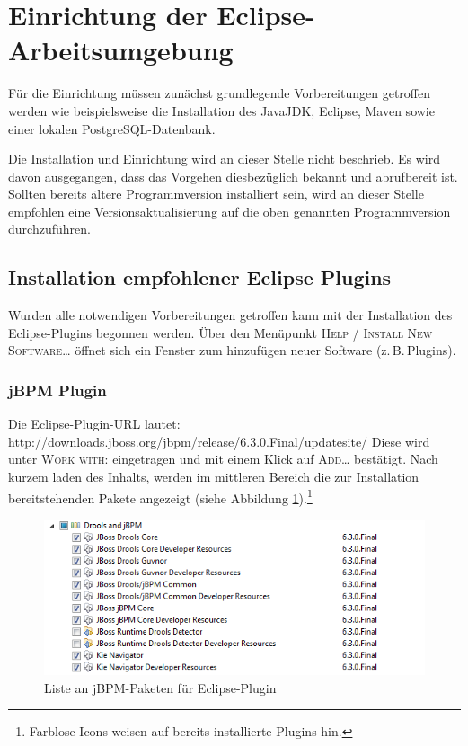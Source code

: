 \section{Einrichtung der Eclipse-Arbeitsumgebung}
Für die Einrichtung müssen zunächst grundlegende Vorbereitungen getroffen werden wie beispielsweise die Installation des JavaJDK, Eclipse, Maven sowie einer lokalen PostgreSQL-Datenbank.

Die Installation und Einrichtung wird an dieser Stelle nicht beschrieb. Es wird davon ausgegangen, dass das Vorgehen diesbezüglich bekannt und abrufbereit ist. Sollten bereits ältere Programmversion installiert sein, wird an dieser Stelle empfohlen eine Versionsaktualisierung auf die oben genannten Programmversion durchzuführen.

\subsection{Installation empfohlener Eclipse Plugins}
Wurden alle notwendigen Vorbereitungen getroffen kann mit der Installation des Eclipse-Plugins begonnen werden. Über den Menüpunkt \textsc{Help / Install New Software\ldots} öffnet sich ein Fenster zum hinzufügen neuer Software (z.\,B.\,Plugins).

\subsubsection{jBPM Plugin}
Die Eclipse-Plugin-URL lautet: \url{http://downloads.jboss.org/jbpm/release/6.3.0.Final/updatesite/}
Diese wird unter \textsc{Work with:} eingetragen und mit einem Klick auf \textsc{Add\ldots} bestätigt. Nach kurzem laden des Inhalts, werden im mittleren Bereich die zur Installation bereitstehenden Pakete angezeigt (siehe Abbildung \ref{fig:install-jbpm-package-list}).\footnote{Farblose Icons weisen auf bereits installierte Plugins hin.}
\begin{figure}[htp]
	\centering
	\includegraphics[width=\textwidth]{image/screenshots/install-jbpm-plugin}
	\caption{Liste an jBPM-Paketen für Eclipse-Plugin}\label{fig:install-jbpm-package-list}
\end{figure}

